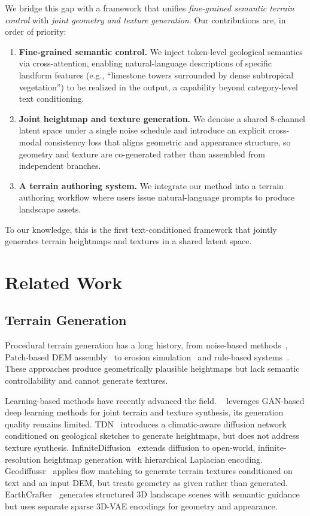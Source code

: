 \documentclass[review]{vgtc}                 %
\begin{document}
We bridge this gap with a framework that unifies \emph{fine-grained semantic terrain control} with \emph{joint geometry and texture generation}.
Our contributions are, in order of priority:
\begin{enumerate}
  \item \textbf{Fine-grained semantic control.} We inject token-level geological semantics via cross-attention, enabling natural-language descriptions of specific landform features (e.g., ``limestone towers surrounded by dense subtropical vegetation'') to be realized in the output, a capability beyond category-level text conditioning.
  \item \textbf{Joint heightmap and texture generation.} We denoise a shared 8-channel latent space under a single noise schedule and introduce an explicit cross-modal consistency loss that aligns geometric and appearance structure, so geometry and texture are co-generated rather than assembled from independent branches.
  \item \textbf{A terrain authoring system.} We integrate our method into a terrain authoring workflow where users issue natural-language prompts to produce landscape assets.
\end{enumerate}
To our knowledge, this is the first text-conditioned framework that jointly generates terrain heightmaps and textures in a shared latent space.

\section{Related Work}

\subsection{Terrain Generation}

Procedural terrain generation has a long history, from noise-based methods~\cite{Perlin:1985, 10.1145/74333.74337}, Patch-based DEM assembly~\cite{4293025} to erosion simulation~\cite{cordonnier2017authoring, https://doi.org/10.1111/cgf.12820} and rule-based systems~\cite{Ebert:2003, genevaux2013terrain}.
These approaches produce geometrically plausible heightmaps but lack semantic controllability and cannot generate textures.

Learning-based methods have recently advanced the field. ~\cite{10.1145/3359998.3369407} leverages GAN-based deep learning methods for joint terrain and texture synthesis, its generation quality remains limited.
TDN~\cite{TDN:2024} introduces a climatic-aware diffusion network conditioned on geological sketches to generate heightmaps, but does not address texture synthesis.
InfiniteDiffusion~\cite{TerrainDiffusion:2026} extends diffusion to open-world, infinite-resolution heightmap generation with hierarchical Laplacian encoding.
Geodiffussr~\cite{Geodiffussr:2025} applies flow matching to generate terrain textures conditioned on text and an input DEM, but treats geometry as given rather than generated.
EarthCrafter~\cite{EarthCrafter:2025} generates structured 3D landscape scenes with semantic guidance but uses separate sparse 3D-VAE encodings for geometry and appearance.
\end{document}
